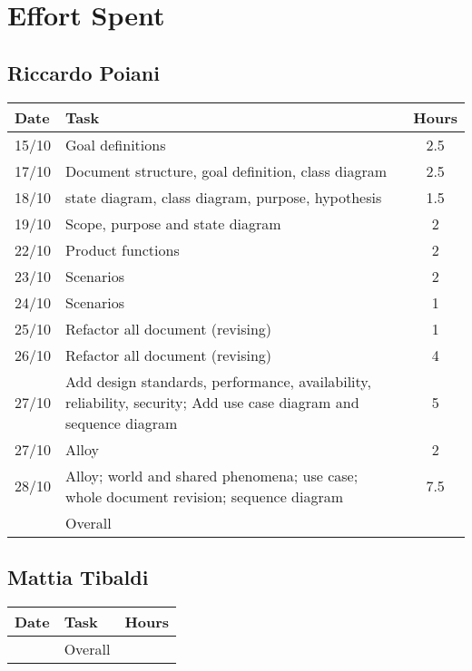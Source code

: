 \section{Effort Spent}

\subsection{Riccardo Poiani}

\begin{table}[H]
\begin{tabularx}{\textwidth}{|l|X|c|}
\hline
\rowcolor[HTML]{C0C0C0} 
Date & Task & Hours\\ \hline
15/10 & Goal definitions & 2.5\\ \hline
17/10 & Document structure, goal definition, class diagram & 2.5\\ \hline
18/10 & state diagram, class diagram, purpose, hypothesis & 1.5\\ \hline
19/10 & Scope, purpose and state diagram & 2\\ \hline
22/10 & Product functions & 2\\ \hline
23/10 & Scenarios & 2\\ \hline
24/10 & Scenarios & 1\\ \hline
25/10 & Refactor all document (revising) & 1\\ \hline
26/10 & Refactor all document (revising) & 4\\ \hline
27/10 & Add design standards, performance, availability, reliability, security; Add use case diagram and sequence diagram & 5\\ \hline
27/10 & Alloy & 2\\ \hline
28/10 & Alloy; world and shared phenomena; use case; whole document revision; sequence diagram & 7.5  \\ \hline
\rowcolor[HTML]{C0C0C0} 
& Overall & \\ \hline
\end{tabularx}
\end{table}

\subsection{Mattia Tibaldi}

\begin{table}[H]
\begin{tabularx}{\textwidth}{|l|X|c|}
\hline
\rowcolor[HTML]{C0C0C0} 
Date & Task & Hours\\ \hline
\rowcolor[HTML]{C0C0C0} 
& Overall & \\ \hline
\end{tabularx}
\end{table}

